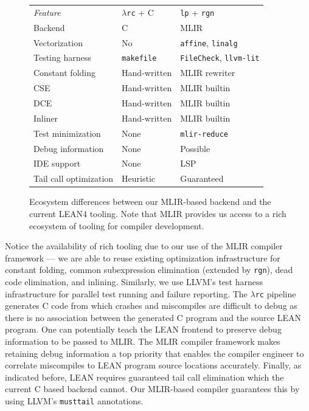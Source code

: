 \documentclass[conference]{IEEEtran}
\newcommand{\lp}{\textcolor{pairedTwoDarkBlue}{\texttt{lp}}}
\newcommand{\rgn}{\textcolor{pairedSixDarkRed}{\texttt{rgn}}}
\newcommand{\lambdarc}{\ensuremath{\lambda}\texttt{rc}}
\begin{document}
\begin{figure}[h]
\begin{center}
\begin{tabular}[t]{b{1.2in}  b{0.8in} b{0.8in} }
\rowcolor{gray!30}
\emph{Feature} & \lambdarc{} + C & \lp{} + \rgn{} \\
Backend & C  & MLIR \\
\rowcolor{gray!10}
Vectorization & No & \texttt{affine}, \texttt{linalg} \\
Testing harness & \texttt{makefile} &  \texttt{FileCheck}, \texttt{llvm-lit}   \\
\rowcolor{gray!10}
Constant folding & Hand-written & MLIR rewriter \\
CSE & Hand-written & MLIR builtin \\
\rowcolor{gray!10}
DCE & Hand-written & MLIR builtin \\
Inliner & Hand-written & MLIR builtin \\
\rowcolor{gray!10}
Test minimization & None & \texttt{mlir-reduce} \\
Debug information & None & Possible  \\
\rowcolor{gray!10}
IDE support & None & LSP  \\
Tail call optimization & Heuristic & Guaranteed \\
\end{tabular}
\end{center}
\caption{Ecosystem differences between our MLIR-based backend and the current LEAN4 tooling.
Note that MLIR provides us access to a rich ecosystem of tooling for compiler development.}
\label{fig:qualitative-analysis}
\end{figure}

Notice the availability of rich tooling due to our use of the MLIR
compiler framework --- we are able to reuse existing optimization infrastructure
for constant folding, common subexpression elimination (extended by \rgn{}),
dead code elimination, and inlining. Similarly, we use LLVM's
test harness infrastructure for parallel test running and failure
reporting. The \lambdarc{} pipeline generates C code from which crashes
and miscompiles are difficult to debug as there is no association between the generated C program
and the source LEAN program.  One can potentially teach the LEAN frontend to preserve debug information
to be passed to MLIR. The MLIR  compiler framework makes retaining debug information
a top priority that enables the compiler engineer to correlate miscompiles
to LEAN program source locations accurately. Finally, as indicated before, LEAN requires
guaranteed tail call elimination which the current C based backend cannot. 
Our MLIR-based compiler guarantees this by using LLVM's
\texttt{musttail} annotations.
\end{document}
